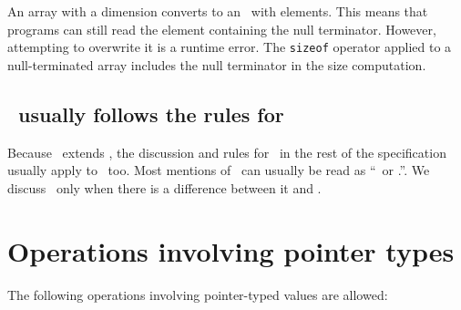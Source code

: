 An  array with a dimension  converts
to an \ntarrayptr\ with  elements.   This means that programs
can still read the element containing the null terminator.  However,
attempting to overwrite it is a runtime error.  The \verb+sizeof+
operator applied to a null-terminated array includes the null
terminator in the size computation.

\subsection{\ntarrayptr\ usually follows the rules for \arrayptr}
Because \ntarrayptr\ extends \arrayptr, the discussion and rules for
\arrayptr\ in the rest of the specification usually apply to \ntarrayptr\
too.  Most mentions of \arrayptr\ can usually be read as
``\arrayptr\ or \ntarrayptr.''.  We discuss \ntarrayptr\ only when
there is a difference between it and \arrayptr.

\section{Operations involving pointer types}

The following operations involving pointer-typed values are allowed:

